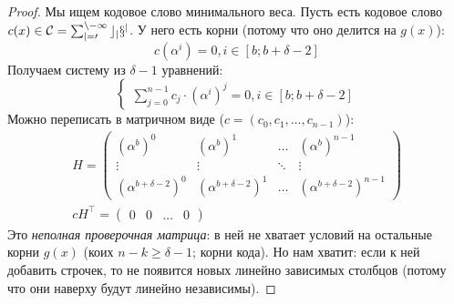 \begin{proof}
	Мы ищем кодовое слово минимального веса.
	Пусть есть кодовое слово $c(x) \in \cal C=\sum_{j=0}^{n-1} c_jx^j$.
	У него есть корни (потому что оно делится на $g(x)$):
	\[
		c(\alpha^i) = 0, i \in [b; b+\delta-2]
	\]
	Получаем систему из $\delta-1$ уравнений:
	\[	
		\begin{cases}
			\sum_{j=0}^{n-1} c_j\cdot(\alpha^i)^j = 0, i \in [b; b + \delta-2]
		\end{cases}
	\]
	Можно переписать в матричном виде ($c = (c_0, c_1, \dots, c_{n-1})$):
	\begin{gather*}
		H=
		\begin{pmatrix}
			(\alpha^b)^0 & (\alpha^b)^1 & \dots & (\alpha^b)^{n-1} \\
			\vdots & \vdots & \ddots & \vdots \\
			(\alpha^{b+\delta-2})^0 & (\alpha^{b+\delta-2})^1 & \dots & (\alpha^{b+\delta-2})^{n-1}
		\end{pmatrix} \\
		cH^\top = \begin{pmatrix}
			0 & 0 & \dots & 0
		\end{pmatrix}
	\end{gather*}
	Это \textit{неполная проверочная матрица}: в ней не хватает условий
	на остальные корни $g(x)$ (коих $n-k \ge \delta - 1$; корни кода).
	Но нам хватит: если к ней добавить строчек, то не появится новых
	линейно зависимых столбцов (потому что они наверху будут линейно независимы).


\end{proof}
